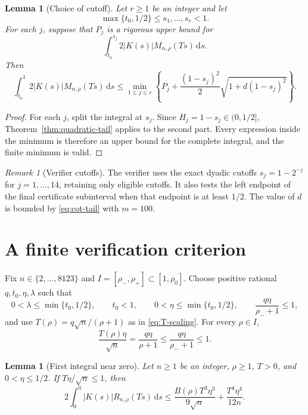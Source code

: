 \documentclass[11pt,a4paper,twoside]{article}
\newcommand{\manualtag}[1]{\tag{#1}}
\newtheorem{lemma}[theorem]{Lemma}
\theoremstyle{remark}
\newtheorem{remark}[theorem]{Remark}
\newcommand{\dd}{\,\mathrm{d}}
\newcommand{\abs}[1]{\lvert#1\rvert}
\newcommand{\rhozero}{\rho_{0}}
\begin{document}
\begin{lemma}[Choice of cutoff]\label{lem:cutoff}
Let \(r\ge1\) be an integer and let
\[
 \max\{t_0,1/2\}\le s_1,\ldots,s_r<1.
\]
For each \(j\), suppose that \(P_j\) is a rigorous upper bound for
\[
 \int_{t_0}^{s_j}
 2\abs{K(s)}M_{n,\rho}(Ts)\dd s.
\]
Then
\begin{equation}
 \int_{t_0}^{1}
 2\abs{K(s)}M_{n,\rho}(Ts)\dd s
 \le
 \min_{1\le j\le r}
 \left\{
 P_j+
 \frac{(1-s_j)^2}{2}
 \sqrt{1+d(1-s_j)^2}
 \right\}.
 \manualtag{32}\label{eq:cutoff}
\end{equation}
\end{lemma}

\begin{proof}
For each \(j\), split the integral at \(s_j\).
Since \(H_j=1-s_j\in(0,1/2]\), Theorem~\ref{thm:quadratic-tail}
applies to the second part.  Every expression inside the minimum is therefore
an upper bound for the complete integral, and the finite minimum is valid.
\end{proof}

\begin{remark}[Verifier cutoffs]\label{rem:verifier-cutoffs}
The verifier uses the exact dyadic cutoffs
\(s_j=1-2^{-j}\) for \(j=1,\ldots,14\), retaining only eligible
cutoffs.  It also tests the left endpoint of the final certificate
subinterval when that endpoint is at least \(1/2\).  The value of \(d\) is
bounded by \eqref{eq:cot-tail} with \(m=100\).
\end{remark}

\section{A finite verification criterion}

Fix \(n\in\{2,\ldots,8123\}\) and
\(I=[\rho_-,\rho_+]\subset[1,\rhozero]\).
Choose positive rational \(q,t_0,\eta,\lambda\) such that
\[
 0<\lambda\le\min\{t_0,1/2\},
 \qquad t_0<1,
 \qquad
 0<\eta\le\min\{t_0,1/2\},
 \qquad
 \frac{q\eta}{\rho_-+1}\le1,
\]
and use \(T(\rho)=q\sqrt n/(\rho+1)\) as in
\eqref{eq:T-scaling}.  For every \(\rho\in I\),
\[
 \frac{T(\rho)\eta}{\sqrt n}
 =
 \frac{q\eta}{\rho+1}
 \le
 \frac{q\eta}{\rho_-+1}
 \le1.
\]

\begin{lemma}[First integral near zero]\label{lem:first-zero}
Let \(n\ge1\) be an integer, \(\rho\ge1\), \(T>0\), and
\(0<\eta\le1/2\).  If \(T\eta/\sqrt n\le1\), then
\begin{equation}
 2\int_0^\eta
 \abs{K(s)}R_{n,\rho}(Ts)\dd s
 \le
 \frac{B(\rho)T^3\eta^3}{9\sqrt n}
 +
 \frac{T^4\eta^4}{12n}.
 \manualtag{33}\label{eq:first-zero}
\end{equation}
\end{lemma}
\end{document}
